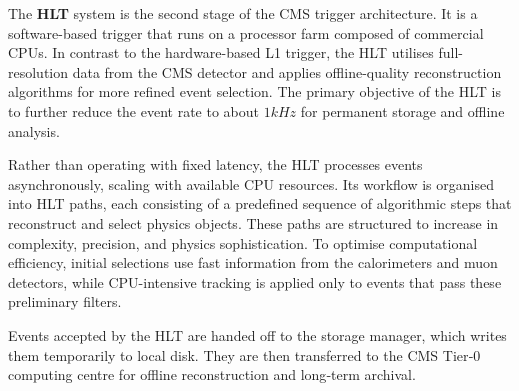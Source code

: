 The \textbf{HLT} system is the second stage of the CMS trigger architecture. It is a software-based trigger that runs on a processor farm composed of commercial CPUs. In contrast to the hardware-based L1 trigger, the HLT utilises full-resolution data from the CMS detector and applies offline-quality reconstruction algorithms for more refined event selection. The primary objective of the HLT is to further reduce the event rate to about $1\unit{kHz}$ for permanent storage and offline analysis. 

Rather than operating with fixed latency, the HLT processes events asynchronously, scaling with available CPU resources. Its workflow is organised into HLT paths, each consisting of a predefined sequence of algorithmic steps that reconstruct and select physics objects. These paths are structured to increase in complexity, precision, and physics sophistication. To optimise computational efficiency, initial selections use fast information from the calorimeters and muon detectors, while CPU-intensive tracking is applied only to events that pass these preliminary filters. 

Events accepted by the HLT are handed off to the storage manager, which writes them temporarily to local disk. They are then transferred to the CMS Tier‑0 computing centre for offline reconstruction and long‑term archival.



